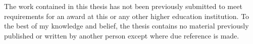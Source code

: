 
The work contained in this thesis has not been previously submitted to meet requirements for an award at this or any other higher education institution. To the best of my knowledge and belief, the thesis contains no material previously published or written by another person except where due reference is made.